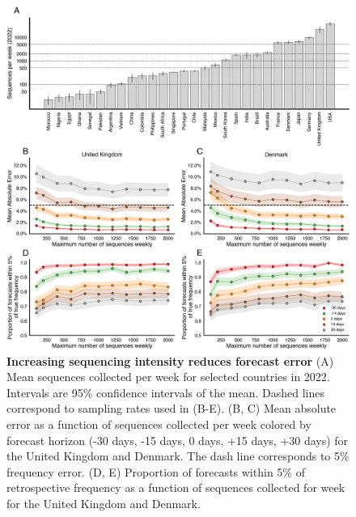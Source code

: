 \documentclass[11pt,oneside,letterpaper]{article}
\begin{document}
\begin{figure}[tb!]
    \centering
    \includegraphics[width=1.0\linewidth]{figures/downscaling_sequencing.png}
    \caption{
			\textbf{Increasing sequencing intensity reduces forecast error}
    	(A) Mean sequences collected per week for selected countries in 2022.
			Intervals are 95\% confidence intervals of the mean.
			Dashed lines correspond to sampling rates used in (B-E).
    	(B, C) Mean absolute error as a function of sequences collected per week colored by forecast horizon (-30 days, -15 days, 0 days, +15 days, +30 days) for the United Kingdom and Denmark.
			The dash line corresponds to 5\% frequency error.
    	(D, E) Proportion of forecasts within 5\% of retrospective frequency as a function of sequences collected for week for the United Kingdom and Denmark.
  	}
    \label{fig:downscaling}
\end{figure}
\end{document}
